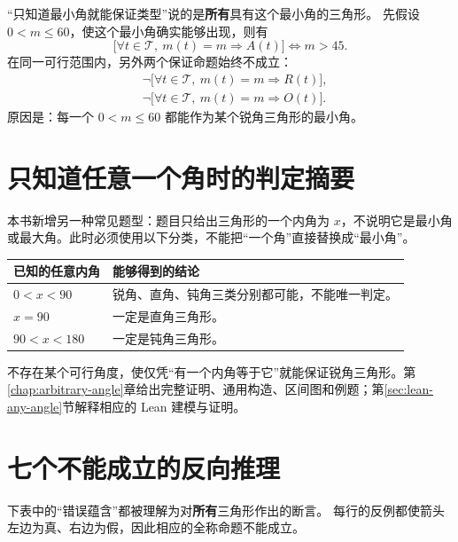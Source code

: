 \documentclass[UTF8,a4paper,zihao=-4,oneside,openany,fontset=fandol]{ctexbook}
\theoremstyle{definition}
\theoremstyle{remark}
\begin{document}
“只知道最小角就能保证类型”说的是\textbf{所有}具有这个最小角的三角形。
先假设 $0<m\le60$，使这个最小角确实能够出现，则有
\[
\boxed{
\bigl[\forall t\in\mathcal T,\ m(t)=m\Longrightarrow A(t)\bigr]
\Longleftrightarrow m>45.}
\]
在同一可行范围内，另外两个保证命题始终不成立：
\begin{align*}
&\neg\bigl[\forall t\in\mathcal T,\ m(t)=m\Longrightarrow R(t)\bigr],\\
&\neg\bigl[\forall t\in\mathcal T,\ m(t)=m\Longrightarrow O(t)\bigr].
\end{align*}
原因是：每一个 $0<m\le60$ 都能作为某个锐角三角形的最小角。


\section{只知道任意一个角时的判定摘要}

本书新增另一种常见题型：题目只给出三角形的一个内角为 $x$，不说明它是最小角或最大角。此时必须使用以下分类，不能把“一个角”直接替换成“最小角”。
\begin{center}
\begin{tabularx}{\textwidth}{|p{}|X|}
\hline
已知的任意内角 & 能够得到的结论\\
\hline
$0<x<90$ & 锐角、直角、钝角三类分别都可能，不能唯一判定。\\
\hline
$x=90$ & 一定是直角三角形。\\
\hline
$90<x<180$ & 一定是钝角三角形。\\
\hline
\end{tabularx}
\end{center}
不存在某个可行角度，使仅凭“有一个内角等于它”就能保证锐角三角形。第\ref{chap:arbitrary-angle}章给出完整证明、通用构造、区间图和例题；第\ref{sec:lean-any-angle}节解释相应的 Lean 建模与证明。

\section{七个不能成立的反向推理}

下表中的“错误蕴含”都被理解为对\textbf{所有}三角形作出的断言。
每行的反例都使箭头左边为真、右边为假，因此相应的全称命题不能成立。
\end{document}
